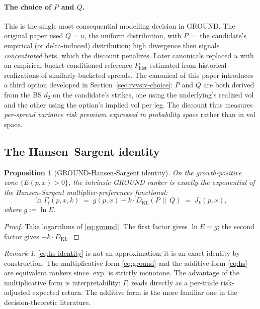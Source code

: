 \documentclass[11pt]{article}
\newcommand{\GROUND}{\Gamma_{\mathrm{i}}}
\newcommand{\KL}{D_{\mathrm{KL}}}
\newtheorem{proposition}{Proposition}
\theoremstyle{definition}
\theoremstyle{remark}
\newtheorem*{remark}{Remark}
\begin{document}
\paragraph{The choice of $P$ and $Q$.}
This is the single most consequential modelling decision in GROUND.
The original \citet{mercurio2020} paper used $Q = u$, the uniform
distribution, with $P = $ the candidate's empirical (or delta-induced)
distribution; high divergence then signals \emph{concentrated} bets,
which the discount penalizes. Later canonicals replaced $u$ with an
empirical bucket-conditioned reference $P_{\mathrm{hist}}$ estimated
from historical realizations of similarly-bucketed spreads. The
canonical of this paper introduces a third option developed in
Section~\ref{sec:rvvsiv-choice}: $P$ and $Q$ are both derived from
the BS $d_2$ on the candidate's strikes, one using the underlying's
realized vol and the other using the option's implied vol per leg.
The discount thus measures \emph{per-spread variance risk premium
expressed in probability space} rather than in vol space.

\subsection{The Hansen--Sargent identity}

\begin{proposition}[GROUND-Hansen-Sargent identity]
\label{prop:hs}
On the growth-positive cone $\{E(p, x) > 0\}$, the intrinsic GROUND
ranker is exactly the exponential of the Hansen-Sargent multiplier-preferences
functional:
\begin{equation}
\ln \GROUND(p, x, k) \;=\; g(p, x) - k \cdot \KL(P \,\|\, Q) \;=\; J_k(p, x),
\label{eq:hs-identity}
\end{equation}
where $g := \ln E$.
\end{proposition}

\begin{proof}
Take logarithms of \eqref{eq:ground}. The first factor gives $\ln E = g$;
the second factor gives $-k \cdot \KL$.
\end{proof}

\begin{remark}
\eqref{eq:hs-identity} is not an approximation; it is an exact identity
by construction. The multiplicative form \eqref{eq:ground} and the
additive form \eqref{eq:hs} are equivalent rankers since $\exp$ is
strictly monotone. The advantage of the multiplicative form is
interpretability: $\GROUND$ reads directly as a per-trade
risk-adjusted expected return. The additive form is the more familiar
one in the decision-theoretic literature.
\end{remark}
\end{document}

